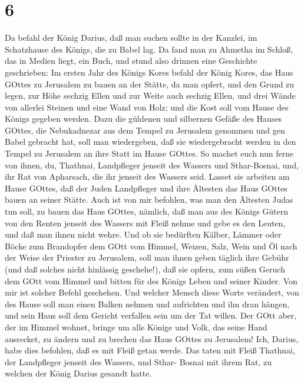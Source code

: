 \hypertarget{section-5}{%
\section{6}\label{section-5}}

 Da befahl der König Darius, daß man suchen sollte in der
Kanzlei, im Schatzhause des Königs, die zu Babel lag.  Da
fand man zu Ahmetha im Schloß, das in Medien liegt, ein Buch, und stund
also drinnen eine Geschichte geschrieben:  Im ersten Jahr
des Königs Kores befahl der König Kores, das Haus GOttes zu Jerusalem zu
bauen an der Stätte, da man opfert, und den Grund zu legen, zur Höhe
sechzig Ellen und zur Weite auch sechzig Ellen,  und drei
Wände von allerlei Steinen und eine Wand von Holz; und die Kost soll vom
Hause des Königs gegeben werden.  Dazu die güldenen und
silbernen Gefäße des Hauses GOttes, die Nebukadnezar aus dem Tempel zu
Jerusalem genommen und gen Babel gebracht hat, soll man wiedergeben, daß
sie wiedergebracht werden in den Tempel zu Jerusalem an ihre Statt im
Hause GOttes.  So machet euch nun ferne von ihnen, du,
Thathnai, Landpfleger jenseit des Wassers und Sthar-Bosnai, und, ihr Rat
von Apharsach, die ihr jenseit des Wassers seid.  Lasset sie
arbeiten am Hause GOttes, daß der Juden Landpfleger und ihre Ältesten
das Haus GOttes bauen an seiner Stätte.  Auch ist von mir
befohlen, was man den Ältesten Judas tun soll, zu bauen das Haus GOttes,
nämlich, daß man aus des Königs Gütern von den Renten jenseit des
Wassers mit Fleiß nehme und gebe es den Leuten, und daß man ihnen nicht
wehre.  Und ob sie bedürften Kälber, Lämmer oder Böcke zum
Brandopfer dem GOtt vom Himmel, Weizen, Salz, Wein und Öl nach der Weise
der Priester zu Jerusalem, soll man ihnen geben täglich ihre Gebühr (und
daß solches nicht hinlässig geschehe!),  daß sie opfern,
zum süßen Geruch dem GOtt vom Himmel und bitten für des Königs Leben und
seiner Kinder.  Von mir ist solcher Befehl geschehen. Und
welcher Mensch diese Worte verändert, von des Hause soll man einen
Balken nehmen und aufrichten und ihn dran hängen, und sein Haus soll dem
Gericht verfallen sein um der Tat willen.  Der GOtt aber,
der im Himmel wohnet, bringe um alle Könige und Volk, das seine Hand
ausrecket, zu ändern und zu brechen das Haus GOttes zu Jerusalem! Ich,
Darius, habe dies befohlen, daß es mit Fleiß getan werde. 
Das taten mit Fleiß Thathnai, der Landpfleger jenseit des Wassers, und
Sthar- Bosnai mit ihrem Rat, zu welchen der König Darius gesandt hatte.

